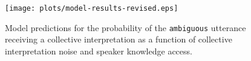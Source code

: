 \documentclass[preprint,12pt,authoryear,titlepage]{elsarticle}
\newcommand{\ndg}[1]{\textcolor{Green}{[ndg: #1]}}
\begin{document}
\begin{figure}[htb!]
	\centering
	\texttt{[image: plots/model-results-revised.eps]}
	\vspace{-20pt}
	\caption{Model predictions for the probability of the \texttt{ambiguous} utterance receiving a collective interpretation as a function of collective interpretation noise and speaker knowledge access.  
	} \label{modelresults} 
\end{figure}


\end{document}
